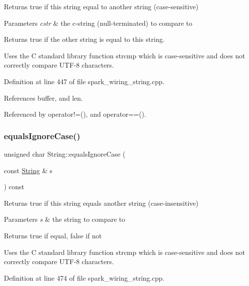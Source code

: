 Returns true if this string equal to another string (case-\/sensitive) 


\begin{DoxyParams}{Parameters}
{\em cstr} & the c-\/string (null-\/terminated) to compare to\\
\hline
\end{DoxyParams}
\begin{DoxyReturn}{Returns}
true if the other string is equal to this string.
\end{DoxyReturn}
Uses the C standard library function strcmp which is case-\/sensitive and does not correctly compare U\+T\+F-\/8 characters. 

Definition at line 447 of file spark\+\_\+wiring\+\_\+string.\+cpp.



References buffer, and len.



Referenced by operator!=(), and operator==().

\mbox{\label{class_string_a3b8832687edda189ae43632d70157b94}} 
\subsubsection{\texorpdfstring{equals\+Ignore\+Case()}{equalsIgnoreCase()}}
{\footnotesize\ttfamily unsigned char String\+::equals\+Ignore\+Case (\begin{DoxyParamCaption}\item[{const \hyperlink{class_string}{String} \&}]{s }\end{DoxyParamCaption}) const}



Returns true if this string equals another string (case-\/insensitive) 


\begin{DoxyParams}{Parameters}
{\em s} & the string to compare to\\
\hline
\end{DoxyParams}
\begin{DoxyReturn}{Returns}
true if equal, false if not
\end{DoxyReturn}
Uses the C standard library function strcmp which is case-\/sensitive and does not correctly compare U\+T\+F-\/8 characters. 

Definition at line 474 of file spark\+\_\+wiring\+\_\+string.\+cpp.



